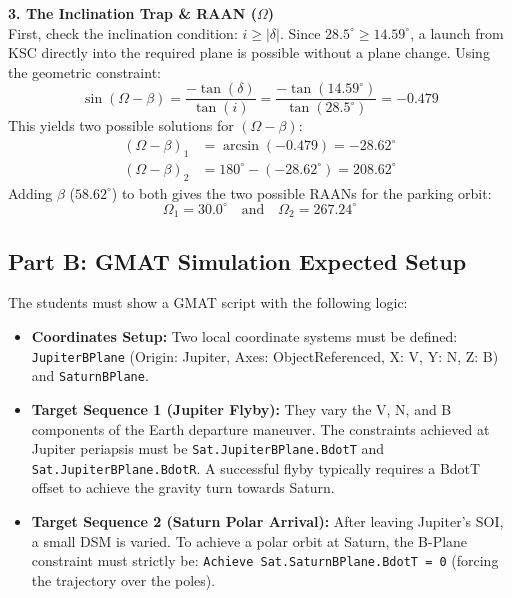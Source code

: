 \documentclass[11pt, letterpaper]{article}
\begin{document}
\textbf{3. The Inclination Trap \& RAAN ($\Omega$)} \\
First, check the inclination condition: $i \ge |\delta|$. Since $28.5^\circ \ge 14.59^\circ$, a launch from KSC directly into the required plane is possible without a plane change.
Using the geometric constraint:
\begin{equation}
    \sin(\Omega - \beta) = \frac{-\tan(\delta)}{\tan(i)} = \frac{-\tan(14.59^\circ)}{\tan(28.5^\circ)} = -0.479
\end{equation}
This yields two possible solutions for $(\Omega - \beta)$:
\begin{align*}
    (\Omega - \beta)_1 &= \arcsin(-0.479) = -28.62^\circ \\
    (\Omega - \beta)_2 &= 180^\circ - (-28.62^\circ) = 208.62^\circ
\end{align*}
Adding $\beta$ ($58.62^\circ$) to both gives the two possible RAANs for the parking orbit:
\begin{equation}
    \Omega_1 = \mathbf{30.0^\circ} \quad \text{and} \quad \Omega_2 = \mathbf{267.24^\circ}
\end{equation}

\subsection*{Part B: GMAT Simulation Expected Setup}
The students must show a GMAT script with the following logic:
\begin{itemize}
    \item \textbf{Coordinates Setup:} Two local coordinate systems must be defined: \texttt{JupiterBPlane} (Origin: Jupiter, Axes: ObjectReferenced, X: V, Y: N, Z: B) and \texttt{SaturnBPlane}.
    \item \textbf{Target Sequence 1 (Jupiter Flyby):} They vary the V, N, and B components of the Earth departure maneuver. The constraints achieved at Jupiter periapsis must be \texttt{Sat.JupiterBPlane.BdotT} and \texttt{Sat.JupiterBPlane.BdotR}. A successful flyby typically requires a BdotT offset to achieve the gravity turn towards Saturn.
    \item \textbf{Target Sequence 2 (Saturn Polar Arrival):} After leaving Jupiter's SOI, a small DSM is varied. To achieve a polar orbit at Saturn, the B-Plane constraint must strictly be: \texttt{Achieve Sat.SaturnBPlane.BdotT = 0} (forcing the trajectory over the poles).
\end{itemize}


\end{document}
